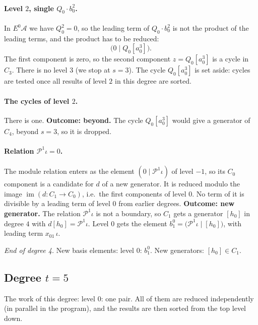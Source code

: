 \documentclass[11pt]{article}
\renewcommand{\P}{\mathcal{P}}
\newcommand{\A}{\mathcal{A}}
\begin{document}
\paragraph{Level $2$, single $Q_{0}\cdot b^{2}_{0}$.} In $E^0\A$ we have $Q_{0}^2 = 0$, so the leading term of $Q_{0}\cdot b^{2}_{0}$ is not the product of the leading terms, and the product has to be reduced:
\[\bigl(0 \;\big|\; Q_{0}[a_0^3]\bigr).\]
The first component is zero, so the second component $z = Q_{0}[a_0^3]$ is a cycle in $C_{3}$.
There is no level $3$ (we stop at $s = 3$).
The cycle $Q_{0}[a_0^3]$ is set aside: cycles are tested once all results of level $2$ in this degree are sorted.
\medskip
\paragraph{The cycles of level $2$.} There is one.
\textbf{Outcome: beyond.} The cycle $Q_{0}[a_0^3]$ would give a generator of $C_{4}$, beyond $s = 3$, so it is dropped.
\medskip
\paragraph{Relation $\P^{1}\iota = 0$.} The module relation enters as the element $(0 \mid \P^{1}\iota)$ of level $-1$, so its $C_0$ component is a candidate for $d$ of a new generator. It is reduced modulo the image $\operatorname{im}(d\colon C_1\to C_0)$, i.e.\ the first components of level $0$.
No term of it is divisible by a leading term of level $0$ from earlier degrees.
\textbf{Outcome: new generator.} The relation $\P^{1}\iota$ is not a boundary, so $C_{1}$ gets a generator $[h_0]$ in degree $4$ with $d[h_0] = \P^{1}\iota$.
Level $0$ gets the element $b^{0}_{1} = \bigl(\P^{1}\iota \;\big|\; [h_0]\bigr)$, with leading term $x_{01}\,\iota$.
\medskip
\par\noindent\emph{End of degree 4.} New basis elements: level $0$: $b^{0}_{1}$. New generators: $[h_0]\in C_{1}$.
\subsection*{Degree $t = 5$}
\noindent The work of this degree: level $0$: one pair. All of them are reduced independently (in parallel in the program), and the results are then sorted from the top level down.
\medskip
\end{document}
